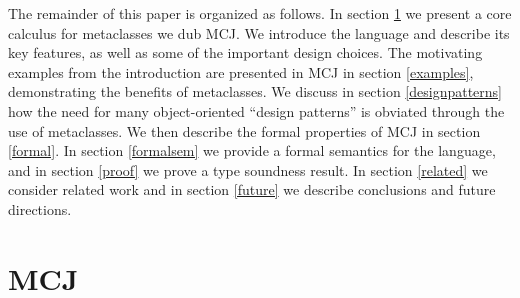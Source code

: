 \documentclass{acm-sigplan}
\begin{document}
The remainder of this paper is organized as follows.  In section
\ref{MCJ} we present a core calculus for metaclasses we dub MCJ.
We introduce the language and describe its key features, as
well as some of the important design choices.  The motivating examples
from the introduction are presented in MCJ in section \ref{examples},
demonstrating the benefits of metaclasses. We discuss in section
\ref{designpatterns} how the need for many object-oriented ``design
patterns'' is obviated through the use of metaclasses. We then
describe the formal properties of MCJ in section \ref{formal}.  In section
\ref{formalsem} we provide a formal semantics for the language, and in
section \ref{proof} we prove a type soundness result.  In section
\ref{related} we consider related work and in section \ref{future} we
describe conclusions and future directions.



\section{MCJ}
\label{MCJ}
\end{document}
